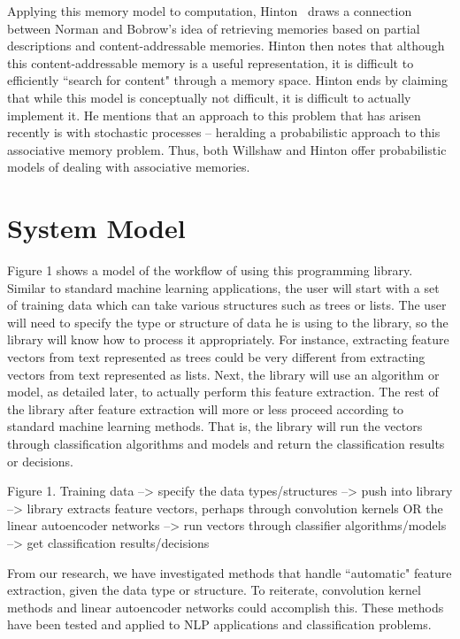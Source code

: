 \documentclass{sig-alternate}
\begin{document}
Applying this memory model to computation, Hinton~\cite{hinton} draws a connection between Norman 
and Bobrow's idea of retrieving memories based on partial descriptions and content-addressable 
memories.  Hinton then notes that although this content-addressable memory is a useful 
representation, it is difficult to efficiently ``search for content" through a memory space. 
Hinton ends by claiming that while this model is conceptually not difficult, it is difficult to 
actually implement it. He mentions that an approach to this problem that has arisen recently is with 
stochastic processes -- heralding a probabilistic approach to this associative memory problem. Thus, 
both Willshaw and Hinton offer probabilistic models
of dealing with associative memories.

\section{System Model}
\label{sec:sysmodel}

Figure 1 shows a model of the workflow of using this programming library. Similar to standard 
machine learning applications, the user will start with a set of training data which can take 
various structures such as trees or lists. The user will need to specify the type or structure
of data he is using to the library, so the library will know how to process it appropriately. 
For instance, extracting feature vectors from text represented as trees could be very different
from extracting vectors from text represented as lists. Next, the library will use an algorithm
or model, as detailed later, to actually perform this feature extraction. The rest of the library 
after feature extraction will more or less proceed according to standard machine learning methods.
That is, the library will run the vectors through classification algorithms and models 
and return the classification results or decisions.


Figure 1. 
Training data --> specify the data types/structures --> push into library --> library extracts feature vectors, perhaps through convolution kernels OR the linear autoencoder networks -->
run vectors through classifier algorithms/models --> get classification results/decisions


From our research, we have investigated methods that handle ``automatic" feature extraction, given
the data type or structure. To reiterate, convolution kernel methods and linear autoencoder networks 
could accomplish this. These methods have been tested and applied to NLP applications and 
classification problems.
\end{document}
